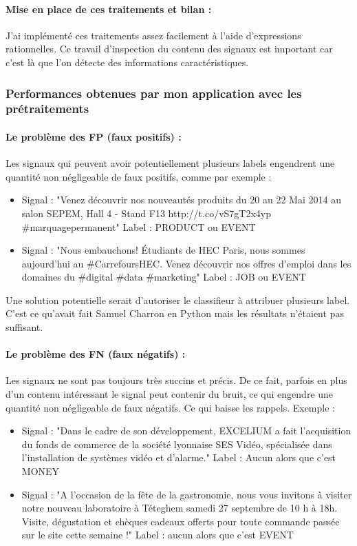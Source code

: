                 \paragraph{Mise en place de ces traitements et bilan :}
                    J'ai implémenté ces traitements assez facilement à l'aide d'expressions rationnelles. Ce travail d'inspection du contenu des signaux est important car c'est là que l'on détecte des informations caractéristiques.

            \subsubsection{Performances obtenues par mon application avec les prétraitements}
                \paragraph{Le problème des FP (faux positifs) :}
                    Les signaux qui peuvent avoir potentiellement plusieurs labels engendrent une quantité non négligeable de faux positifs, comme par exemple :
                    \begin{itemize}
                        \item Signal : "Venez découvrir nos nouveautés produits du 20 au 22 Mai 2014 au salon SEPEM, Hall 4 - Stand F13 http://t.co/vS7gT2x4yp \#marquagepermanent" Label : PRODUCT ou EVENT
                        \item Signal : "Nous embauchons! Étudiants de HEC Paris, nous sommes aujourd'hui au \#CarrefoursHEC. Venez découvrir nos offres d'emploi dans les domaines du \#digital \#data \#marketing" Label : JOB ou EVENT
                    \end{itemize}
                    Une solution potentielle serait d'autoriser le classifieur à attribuer plusieurs label. C'est ce qu'avait fait Samuel Charron en Python mais les résultats n'étaient pas suffisant.

                \paragraph{Le problème des FN (faux négatifs) :}
                    Les signaux ne sont pas toujours très succins et précis. De ce fait, parfois en plus d'un contenu intéressant le signal peut contenir du bruit, ce qui engendre une quantité non négligeable de faux négatifs. Ce qui baisse les rappels. Exemple :
                    \begin{itemize}
                        \item Signal : "Dans le cadre de son développement, EXCELIUM a fait l'acquisition du fonds de commerce de la société lyonnaise SES Vidéo, spécialisée dans l'installation de systèmes vidéo et d'alarme." Label : Aucun alors que c'est MONEY
                        \item Signal : "A l'occasion de la fête de la gastronomie, nous vous invitons à visiter notre nouveau laboratoire à Téteghem samedi 27 septembre de 10 h à 18h. Visite, dégustation et chèques cadeaux offerts pour toute commande passée sur le site cette semaine !" Label : aucun alors que c'est EVENT
                    \end{itemize}

